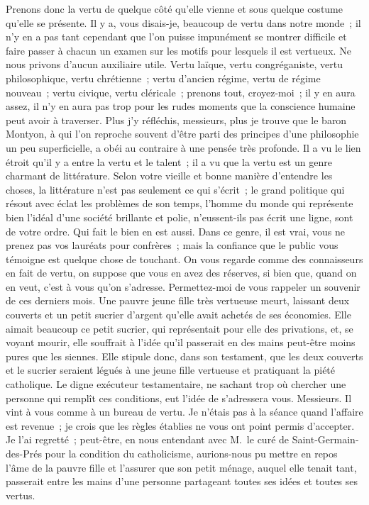 \documentclass[french,twoside]{book} %
\newcommand\persName[1]{#1}
\begin{document}
Prenons donc la vertu de quelque côté qu’elle vienne et sous quelque costume qu’elle se présente. Il y a, vous disais-je, beaucoup de vertu dans notre monde ; il n’y en a pas tant cependant que l’on puisse impunément se montrer difficile et faire passer à chacun un examen sur les motifs pour lesquels il est vertueux. Ne nous privons d’aucun auxiliaire utile. Vertu laïque, vertu congréganiste, vertu philosophique, vertu chrétienne ; vertu d’ancien régime, vertu de régime nouveau ; vertu civique, vertu cléricale ; prenons tout, croyez-moi ; il y en aura assez, il n’y en aura pas trop pour les rudes moments que la conscience humaine peut avoir à traverser. Plus j’y réfléchis, messieurs, plus je trouve que le {\persName baron Montyon}, à qui l’on reproche souvent d’être parti des principes d’une philosophie un peu superficielle, a obéi au contraire à une pensée très profonde. Il a vu le lien étroit qu’il y a entre la vertu et le talent ; il a vu que la vertu est un genre charmant de littérature. Selon votre vieille et bonne manière d’entendre les choses, la littérature n’est pas seulement ce qui s’écrit ; le grand politique qui résout avec éclat les problèmes de son temps, l’homme du monde qui représente bien l’idéal d’une société brillante et polie, n’eussent-ils pas écrit une ligne, sont de votre ordre. Qui fait le bien en est aussi. Dans ce genre, il est vrai, vous ne prenez pas vos lauréats pour confrères ; mais la confiance que le public vous témoigne est quelque chose de touchant. On vous regarde comme des connaisseurs en fait de vertu, on suppose que vous en avez des réserves, si bien que, quand on en veut, c’est à vous qu’on s’adresse. Permettez-moi de vous rappeler un souvenir de ces derniers mois. Une pauvre jeune fille très vertueuse meurt, laissant deux couverts et un petit sucrier d’argent qu’elle avait achetés de ses économies. Elle aimait beaucoup ce petit sucrier, qui représentait pour elle des privations, et, se voyant mourir, elle souffrait à l’idée qu’il passerait en des mains peut-être moins pures que les siennes. Elle stipule donc, dans son testament, que les deux couverts et le sucrier seraient légués à une jeune fille vertueuse et pratiquant la piété catholique. Le digne exécuteur testamentaire, ne sachant trop où chercher une personne qui remplît ces conditions, eut l’idée de s’adressera vous. Messieurs. Il vint à vous comme à un bureau de vertu. Je n’étais pas à la séance quand l’affaire est revenue ; je crois que les règles établies ne vous ont point permis d’accepter. Je l’ai regretté ; peut-être, en nous entendant avec {\persName M. le curé de Saint-Germain-des-Prés} pour la condition du catholicisme, aurions-nous pu mettre en repos l’âme de la pauvre fille et l’assurer que son petit ménage, auquel elle tenait tant, passerait entre les mains d’une personne partageant toutes ses idées et toutes ses vertus.\par
\end{document}
